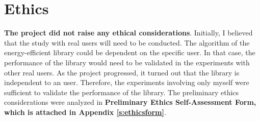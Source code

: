 \section{Ethics}
\label{s:ethics}

\hspace{10pt} \textbf{The project did not raise any ethical considerations}. Initially, I believed that the study with real users will need to be conducted. The algorithm of the energy-efficient library could be dependent on the specific user. In that case, the performance of the library would need to be validated in the experiments with other real users. As the project progressed, it turned out that the library is independent to an user. Therefore, the experiments involving only myself were sufficient to validate the performance of the library. The preliminary ethics considerations were analyzed in \textbf{Preliminary Ethics Self-Assessment Form, which is attached in Appendix \ref{s:ethicsform}}.